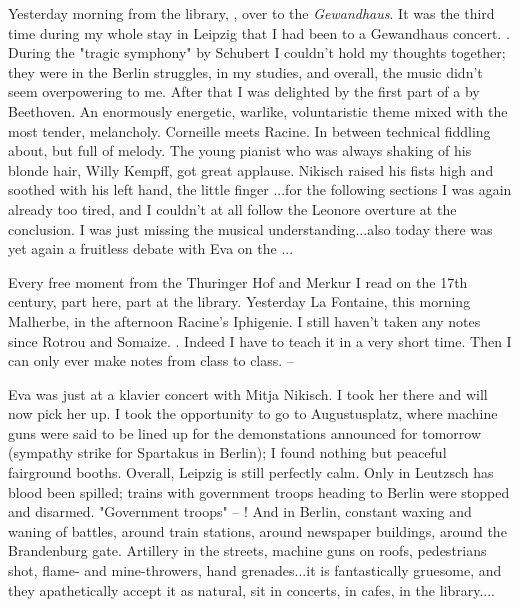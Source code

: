 
Yesterday morning from the library, , over to the \textit{Gewandhaus}. It was the third time during my whole stay in Leipzig that I had been to a Gewandhaus concert. . During the "tragic symphony" by Schubert I couldn't hold my thoughts together; they were in the Berlin struggles, in my studies, and overall, the music didn't seem overpowering to me. After that I was delighted by the first part of a  by Beethoven. An enormously energetic, warlike, voluntaristic theme mixed with the most tender, melancholy. Corneille meets Racine. In between technical fiddling about, but full of melody. The young pianist who was always shaking of his blonde hair, Willy Kempff, got great applause. Nikisch raised his fists high and soothed with his left hand, the little finger ...for the following sections I was again already too tired, and I couldn't at all follow the Leonore overture at the conclusion. I was just missing the musical understanding...also today there was yet again a fruitless debate with Eva on the ...

Every free moment from the Thuringer Hof and Merkur I read on the 17th century, part here, part at the library. Yesterday La Fontaine, this morning Malherbe, in the afternoon Racine's Iphigenie. I still haven't taken any notes since Rotrou and Somaize. . Indeed I have to teach it in a very short time. Then I can only ever make notes from class to class. --

Eva was just at a klavier concert with Mitja Nikisch. I took her there and will now pick her up. I took the opportunity to go to Augustusplatz, where machine guns were said to be lined up for the demonstations announced for tomorrow (sympathy strike for Spartakus in Berlin); I found nothing but peaceful fairground booths. Overall, Leipzig is still perfectly calm. Only in Leutzsch has blood been spilled; trains with government troops heading to Berlin were stopped and disarmed. "Government troops" -- ! And in Berlin, constant waxing and waning of battles, around train stations, around newspaper buildings, around the Brandenburg gate. Artillery in the streets, machine guns on roofs, pedestrians shot, flame- and mine-throwers, hand grenades...it is fantastically gruesome, and they apathetically accept it as natural, sit in concerts, in cafes, in the library....

